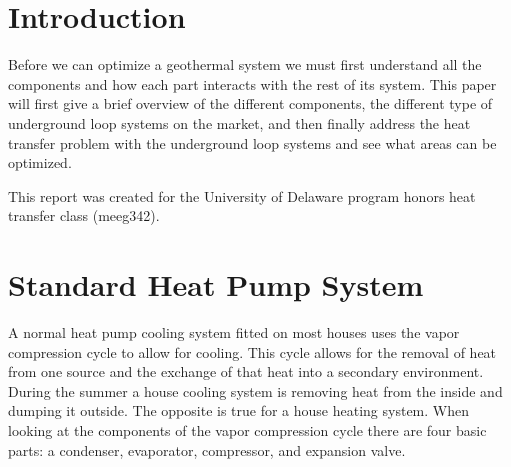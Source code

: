 \section{Introduction}
Before we can optimize a geothermal system we must first understand all the components and how each part interacts with the rest of its system. This paper will first give a brief overview of the different components, the different type of underground loop systems on the market, and then finally address the heat transfer problem with the underground loop systems and see what areas can be optimized.

This report was created for the University of Delaware program honors heat transfer class (meeg342).


\section{Standard Heat Pump System}
A normal heat pump cooling system fitted on most houses uses the vapor compression cycle to allow for cooling. This cycle allows for the removal of heat from one source and the exchange of that heat into a secondary environment. During the summer a house cooling system is removing heat from the inside and dumping it outside. The opposite is true for a house heating system. When looking at the components of the vapor compression cycle there are four basic parts: a condenser, evaporator, compressor, and expansion valve.
%
\begin{figure}[!tbph]
  \centering
  \hfill
\end{figure}
